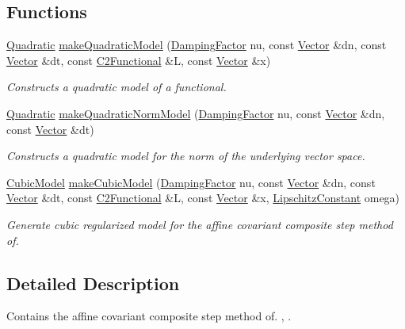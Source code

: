 \subsection*{\-Functions}
\begin{DoxyCompactItemize}
\item 
\hyperlink{classSpacy_1_1Quadratic}{\-Quadratic} \hyperlink{namespaceSpacy_1_1CompositeStep_a0366dfcec4d1f3f5f304eddce82bc58d}{make\-Quadratic\-Model} (\hyperlink{classSpacy_1_1DampingFactor}{\-Damping\-Factor} nu, const \hyperlink{classSpacy_1_1Vector}{\-Vector} \&dn, const \hyperlink{classSpacy_1_1Vector}{\-Vector} \&dt, const \hyperlink{classSpacy_1_1C2Functional}{\-C2\-Functional} \&\-L, const \hyperlink{classSpacy_1_1Vector}{\-Vector} \&x)
\begin{DoxyCompactList}\small\item\em \-Constructs a quadratic model of a functional. \end{DoxyCompactList}\item 
\hyperlink{classSpacy_1_1Quadratic}{\-Quadratic} \hyperlink{namespaceSpacy_1_1CompositeStep_ad7e8e9200b3ebfa44c75b79d08cd7db9}{make\-Quadratic\-Norm\-Model} (\hyperlink{classSpacy_1_1DampingFactor}{\-Damping\-Factor} nu, const \hyperlink{classSpacy_1_1Vector}{\-Vector} \&dn, const \hyperlink{classSpacy_1_1Vector}{\-Vector} \&dt)
\begin{DoxyCompactList}\small\item\em \-Constructs a quadratic model for the norm of the underlying vector space. \end{DoxyCompactList}\item 
\hyperlink{classSpacy_1_1CompositeStep_1_1CubicModel}{\-Cubic\-Model} \hyperlink{namespaceSpacy_1_1CompositeStep_a93960636b40b8cf95004a5dc27f961eb}{make\-Cubic\-Model} (\hyperlink{classSpacy_1_1DampingFactor}{\-Damping\-Factor} nu, const \hyperlink{classSpacy_1_1Vector}{\-Vector} \&dn, const \hyperlink{classSpacy_1_1Vector}{\-Vector} \&dt, const \hyperlink{classSpacy_1_1C2Functional}{\-C2\-Functional} \&\-L, const \hyperlink{classSpacy_1_1Vector}{\-Vector} \&x, \hyperlink{classSpacy_1_1LipschitzConstant}{\-Lipschitz\-Constant} omega)
\begin{DoxyCompactList}\small\item\em \-Generate cubic regularized model for the affine covariant composite step method of. \end{DoxyCompactList}\end{DoxyCompactItemize}


\subsection{\-Detailed \-Description}
\-Contains the affine covariant composite step method of. \cite{Lubkoll2015}, \cite{Lubkoll2015a}. 

